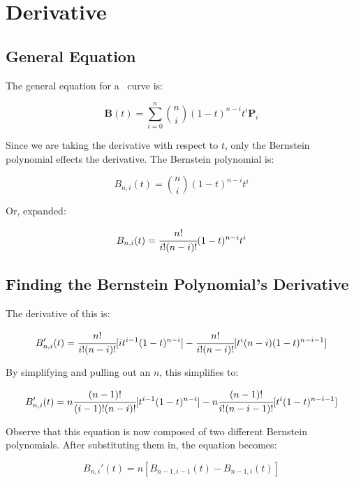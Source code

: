 \documentclass[oneside,usepdftitle=true]{article}
\begin{document}
\maketitle
\tableofcontents
\setcounter{tocdepth}{2}

\newpage

\section{Derivative}
\label{sec:Derivative}

\subsection{General Equation}
The general equation for a \Bezier\ curve is:

\begin{equation}\label{eqn:bezier_general}
	\mathbf{B}(t) = \sum_{i=0}^n {n\choose i} (1 - t)^{n - i} t^i \mathbf{P}_i
\end{equation}

Since we are taking the derivative with respect to $t$, only the Bernstein polynomial effects the derivative.  The Bernstein polynomial is:

\[ B_{n,i}(t) = {n\choose i} (1 - t)^{n - i} t^i \]

Or, expanded:

\[ B_{n,i}(t) = \cfrac{n!}{i! (n - i)!} (1 - t)^{n - i} t^i \]

\subsection{Finding the Bernstein Polynomial's Derivative}

The derivative of this is:

\[ B_{n,i}'(t) = \cfrac{n!}{i! (n - i)!} [ it^{i - 1} (1 - t)^{n - i}] - \cfrac{n!}{i! (n - i)!}[t^i (n - i)(1 - t)^{n - i - 1}] \]

By simplifying and pulling out an $n$, this simplifies to:

\[ B_{n,i}'(t) = n \cfrac{(n - 1)!}{(i - 1)! (n - i)!} [ t^{i - 1} (1 - t)^{n - i}] - n \cfrac{(n - 1)!}{i! (n - i - 1)!}[t^i (1 - t)^{n - i - 1}] \]

Observe that this equation is now composed of two different Bernstein polynomials.  After substituting them in, the equation becomes:

\begin{equation}\label{eqn:bernstein_deriv}
	B_{n,i}'(t) = n [ B_{n-1,i-1}(t) - B_{n-1,i}(t) ]
\end{equation}
\end{document}
